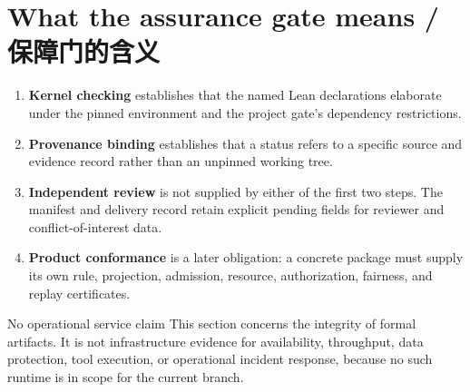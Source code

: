 \begin{MWMetricGrid}
\end{MWMetricGrid}

\section{What the assurance gate means / 保障门的含义}

\begin{enumerate}
  \item \textbf{Kernel checking} establishes that the named Lean declarations elaborate under the
    pinned environment and the project gate's dependency restrictions.
  \item \textbf{Provenance binding} establishes that a status refers to a specific source and
    evidence record rather than an unpinned working tree.
  \item \textbf{Independent review} is not supplied by either of the first two steps. The manifest
    and delivery record retain explicit pending fields for reviewer and conflict-of-interest data.
  \item \textbf{Product conformance} is a later obligation: a concrete package must supply its
    own rule, projection, admission, resource, authorization, fairness, and replay certificates.
\end{enumerate}

\begin{MWCallout}[MWAmber]{No operational service claim}
This section concerns the integrity of formal artifacts. It is not infrastructure evidence for
availability, throughput, data protection, tool execution, or operational incident response,
because no such runtime is in scope for the current branch.
\end{MWCallout}
